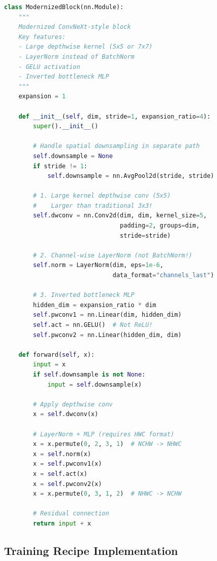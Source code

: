 \documentclass{article}
\begin{document}
\begin{lstlisting}[language=Python, caption=ConvNeXt Block]
class ModernizedBlock(nn.Module):
    """
    Modernized ConvNeXt-style block
    Key features:
    - Large depthwise kernel (5x5 or 7x7)
    - LayerNorm instead of BatchNorm
    - GELU activation
    - Inverted bottleneck MLP
    """
    expansion = 1
    
    def __init__(self, dim, stride=1, expansion_ratio=4):
        super().__init__()
        
        # Handle spatial downsampling in separate path
        self.downsample = None
        if stride != 1:
            self.downsample = nn.AvgPool2d(stride, stride)
        
        # 1. Large kernel depthwise conv (5x5)
        #    Larger than traditional 3x3!
        self.dwconv = nn.Conv2d(dim, dim, kernel_size=5,
                                padding=2, groups=dim, 
                                stride=stride)
        
        # 2. Channel-wise LayerNorm (not BatchNorm!)
        self.norm = LayerNorm(dim, eps=1e-6, 
                              data_format="channels_last")
        
        # 3. Inverted bottleneck MLP
        hidden_dim = expansion_ratio * dim
        self.pwconv1 = nn.Linear(dim, hidden_dim)
        self.act = nn.GELU()  # Not ReLU!
        self.pwconv2 = nn.Linear(hidden_dim, dim)
    
    def forward(self, x):
        input = x
        if self.downsample is not None:
            input = self.downsample(x)
        
        # Apply depthwise conv
        x = self.dwconv(x)
        
        # LayerNorm + MLP (requires HWC format)
        x = x.permute(0, 2, 3, 1)  # NCHW -> NHWC
        x = self.norm(x)
        x = self.pwconv1(x)
        x = self.act(x)
        x = self.pwconv2(x)
        x = x.permute(0, 3, 1, 2)  # NHWC -> NCHW
        
        # Residual connection
        return input + x
\end{lstlisting}

\subsection{Training Recipe Implementation}
\end{document}
